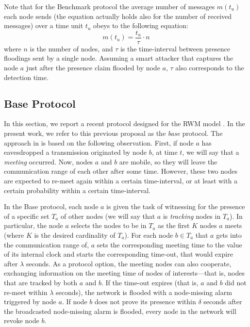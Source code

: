\documentclass{IEEEconf}
\begin{document}
Note that for the Benchmark protocol the average number of messages $m(t_u)$ each node sends (the equation actually holds also for the number of received messages) over a time unit $t_u$ obeys to the following equation:
\begin{equation}
m(t_u)=\frac{t_u}{\tau}\cdot n
\end{equation}
where $n$ is the number of nodes, and $\tau$ is the time-interval between presence floodings sent by a single node. Assuming a smart attacker that captures the node $a$ just after the presence claim flooded by node $a$, $\tau$ also corresponds to the detection time.




\subsection{Base Protocol}
\label{base}

In this section, we report a recent  protocol  \cite{CDMM:WiSec08:Emergent, CDMM:EURASIP:2009} designed for the RWM model \cite{Broch:RWM:MobiCom98}. In the present work, we refer to this previous proposal as the {\em base} protocol.
The approach in \cite{CDMM:WiSec08:Emergent, CDMM:EURASIP:2009} is based on the following observation. First, if node $a$ has eavesdropped a transmission originated by node $b$, at time $t$, we will say that a {\em meeting} occurred. Now, nodes  $a$ and $b$ are mobile, so they will leave the communication range of each other after some time. However, these two nodes are expected to re-meet again within a certain time-interval, or at least with a certain probability within a certain time-interval.


In the Base protocol, each node $a$ is given the task of witnessing for the presence of a specific set $T_a$ of other nodes (we will say that $a$ is  \emph{tracking} nodes in $T_a$). In particular, the node $a$ selects the nodes to be in $T_a$ as the first $K$ nodes $a$ meets (where $K$ is the desired cardinality of $T_a$).
For each node $b \in T_a$ that $a$ gets into the communication range of, $a$ sets the corresponding meeting time to the value of its internal clock and starts the corresponding time-out, that would expire
after $\lambda$ seconds. As a protocol option, the meeting nodes can also cooperate, exchanging information on the meeting time of nodes of interests---that is, nodes that are tracked by both $a$ and $b$.
If the time-out expires (that is, $a$ and $b$ did not re-meet within $\lambda$ seconds), the network is flooded with a node-missing alarm triggered by node $a$. If node $b$ does not prove its presence within  $\delta$ seconds after the broadcasted node-missing alarm is flooded, every node in the network will revoke node $b$.
\end{document}
